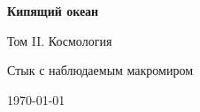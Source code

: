 \begin{titlepage}
  \centering
  \vspace*{2cm}
  {\LARGE\bfseries Кипящий океан\par}
  \vspace{0.8cm}
  {\Large Том II. Космология\par}
  \vspace{1.2cm}
  {\large Стык с наблюдаемым макромиром\par}
  \vfill
  {\large \today\par}
\end{titlepage}
\cleardoublepage
\tableofcontents
\cleardoublepage
